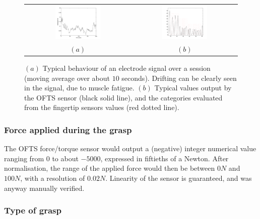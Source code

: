 \begin{figure}[!ht] \centering
  \begin{tabular}{cc}
    \includegraphics[width=0.45\textwidth]{figs/el8_movingAvg_s1} &
    \includegraphics[width=0.45\textwidth]{figs/targets_zoom1} \\
    $(a)$ & $(b)$ \\
  \end{tabular}
  \caption{$(a)$ Typical behaviour of an electrode signal over a
    session (moving average over about $10$ seconds). Drifting can be
    clearly seen in the signal, due to muscle fatigue. $(b)$ Typical
    values output by the OFTS sensor (black solid line), and the
    categories evaluated from the fingertip sensors values (red dotted
    line).}
  \label{fig:drift}
\end{figure}

\subsubsection{Force applied during the grasp}

The OFTS force/torque sensor would output a (negative) integer
numerical value ranging from $0$ to about $-5000$, expressed in
fiftieths of a Newton. After normalisation, the range of the applied
force would then be between $0N$ and $100N$, with a resolution of
$0.02N$. Linearity of the sensor is guaranteed, and was anyway
manually verified.

\subsubsection{Type of grasp}

